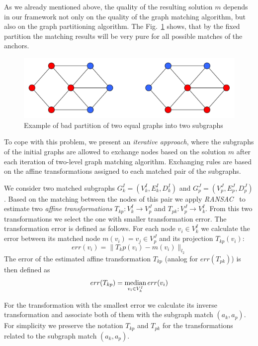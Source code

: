\documentclass[
	fontsize=12pt,
	paper=a4,
	twoside=false,
	numbers=noenddot,
	plainheadsepline,
	toc=listof,
	toc=bibliography
]{scrartcl}
\def\median{\mathop{\rm median}} 						%
\begin{document}
As we already mentioned above, the quality of the resulting solution $m$ depends in our framework not only on the quality of the graph matching algorithm, but also on the graph partitioning algorithm. The Fig.~\ref{fig:badpartition} shows, that by the fixed partition the matching results will be very pure for all possible matches of the anchors.

\begin{figure}
	\centering
	\includegraphics[scale=0.35]{fig/badpartition.pdf}
	\caption{Example of bad partition of two equal graphs into two subgraphs} \label{fig:badpartition}
\end{figure}


To cope with this problem, we present an \emph{iterative approach}, where the subgraphs of the initial graphs are allowed to exchange nodes based on the solution $m$ after each iteration of two-level graph matching algorithm. Exchanging rules are based on the affine transformations assigned to each matched pair of the subgraphs.

We consider two matched subgraphs $G^I_k=(V^I_k, E^I_k, D^I_k)$ and  $G^J_p=(V^J_p, E^J_p, D^J_p)$. Based on the matching between the nodes of this pair we apply \emph{RANSAC}~\cite{RANSAC} to estimate two \emph{affine transformations} $T_{kp}:V^I_k\rightarrow V^J_p$ and $T_{pk}:V^J_p\rightarrow V^I_k$. From this two transformations we select the one with smaller transformation error. The transformation error is defined as follows. For each node $v_i\in V^I_k$ we calculate the error between its matched node $m(v_i) = v_j\in V^J_p$ and its projection $T_{kp}(v_i)$: 
\begin{equation} \label{eq:err_v}
err(v_i) = \|T_kp(v_i) - m(v_i)\|_{l_2}
\end{equation}
The error of the estimated affine transformation $T_{kp}$ (analog for  $err(T_{pk})$) is then defined as
\begin{equation} \label{eq:err_T}
err(T_{kp}) = \median_{v_i\in V^I_k}err(v_i)
\end{equation}

For the transformation with the smallest error we calculate its inverse transformation and associate both of them with the subgraph match $(a_k, a_p)$. For simplicity we preserve the notation $T_{kp}$ and $T_{pk}$ for the transformations related to the subgraph match $(a_k, a_p)$.
\end{document}
